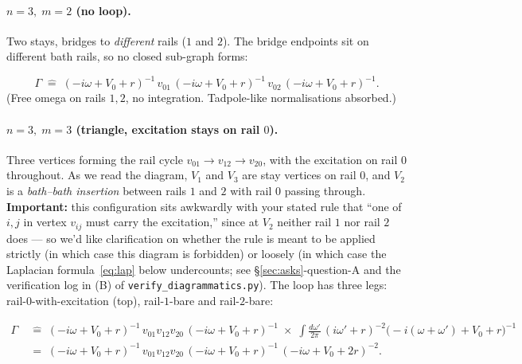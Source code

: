 \documentclass[11pt,a4paper]{article}
\newcommand{\Gex}{(-i\omega+V_{0}+r)^{-1}}
\begin{document}
\paragraph{$n{=}3,\;m{=}2$ (no loop).}
Two stays, bridges to \emph{different} rails ($1$ and $2$). The bridge
endpoints sit on different bath rails, so no closed sub-graph forms:
\begin{center}
\end{center}
\[
\Gamma\;\widehat=\;\Gex\, v_{01}\,\Gex\, v_{02}\,\Gex.
\]
(Free omega on rails $1,2$, no integration. Tadpole-like normalisations
absorbed.)

\paragraph{$n{=}3,\;m{=}3$ (triangle, excitation stays on rail $0$).}
Three vertices forming the rail cycle $v_{01}\!\to\!v_{12}\!\to\!v_{20}$,
with the excitation on rail $0$ throughout. As we read the diagram,
$V_{1}$ and $V_{3}$ are stay vertices on rail $0$, and $V_{2}$ is a
\emph{bath--bath insertion} between rails $1$ and $2$ with rail $0$
passing through. \textbf{Important:} this configuration sits awkwardly
with your stated rule that ``one of $i,j$ in vertex $v_{ij}$ must carry
the excitation,'' since at $V_{2}$ neither rail $1$ nor rail $2$ does ---
so we'd like clarification on whether the rule is meant to be applied
strictly (in which case this diagram is forbidden) or loosely (in which
case the Laplacian formula~\ref{eq:lap} below undercounts; see
\S\ref{sec:asks}-question-A and the verification log in (B) of
\texttt{verify\_diagrammatics.py}). The loop has three legs:
rail-$0$-with-excitation (top), rail-$1$-bare and rail-$2$-bare:
\begin{center}
\end{center}
\begin{align*}
\Gamma \;&\widehat=\; \Gex\,v_{01}v_{12}v_{20}\,\Gex
\;\times\;\int\!\frac{d\omega'}{2\pi}\,(i\omega'+r)^{-2}\big(-i(\omega+\omega')+V_{0}+r\big)^{-1}\\
&=\;\Gex\,v_{01}v_{12}v_{20}\,\Gex\,(-i\omega+V_{0}+2r)^{-2}.
\end{align*}
\end{document}
